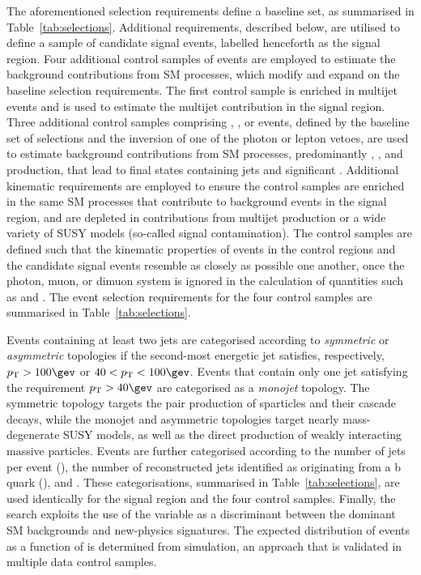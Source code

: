 The aforementioned selection requirements define a baseline set, as
summarised in Table~\ref{tab:selections}. Additional requirements,
described below, are utilised to define a sample of candidate signal
events, labelled henceforth as the signal region. Four additional
control samples of events are employed to estimate the background
contributions from SM processes, which modify and expand on the
baseline selection requirements. The first control sample is enriched
in multijet events and is used to estimate the multijet contribution
in the signal region. Three additional control samples comprising \gj,
\mj, or \mmj events, defined by the baseline set of selections and the
inversion of one of the photon or lepton vetoes, are used to estimate
background contributions from SM processes, predominantly \wlj,
\znunuj, and \ttbar production, that lead to final states containing
jets and significant \ptvecmiss. Additional kinematic requirements are
employed to ensure the control samples are enriched in the same SM
processes that contribute to background events in the signal region,
and are depleted in contributions from multijet production or a wide
variety of SUSY models (\ie so-called signal contamination).  The
control samples are defined such that the kinematic properties of
events in the control regions and the candidate signal events resemble
as closely as possible one another, once the photon, muon, or dimuon
system is ignored in the calculation of quantities such as \scalht and
\HTmiss. The event selection requirements for the four control samples
are summarised in Table~\ref{tab:selections}.

Events containing at least two jets are categorised according to {\it
  symmetric} or {\it asymmetric} topologies if the second-most
energetic jet satisfies, respectively, $\Pt > 100\gev$ or $40 < \Pt <
100\gev$. Events that contain only one jet satisfying the requirement
$\Pt > 40\gev$ are categorised as a {\it monojet} topology. The
symmetric topology targets the pair production of sparticles and their
cascade decays, while the monojet and asymmetric topologies target
nearly mass-degenerate SUSY models, as well as the direct production
of weakly interacting massive particles. Events are further
categorised according to the number of jets per event (\njet), the
number of reconstructed jets identified as originating from a b quark
(\nb), and \scalht. These categorisations, summarised in
Table~\ref{tab:selections}, are used identically for the signal region
and the four control samples. Finally, the search exploits the use of
the \mht variable as a discriminant between the dominant SM
backgrounds and new-physics signatures. The expected distribution of
events as a function of \mht is determined from simulation, an
approach that is validated in multiple data control samples.

